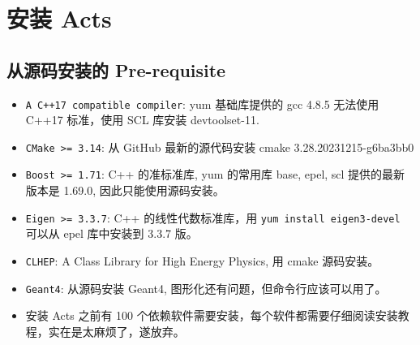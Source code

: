 \section{安装 Acts}
\subsection{从源码安装的 Pre-requisite}
\begin{itemize}
	\item \verb|A C++17 compatible compiler|: yum 基础库提供的 gcc 4.8.5 无法使用 C++17 标准，使用 SCL 库安装 devtoolset-11.
	\item \verb|CMake >= 3.14|: 从 GitHub 最新的源代码安装 cmake 3.28.20231215-g6ba3bb0
	\item \verb|Boost >= 1.71|: C++ 的准标准库, yum 的常用库 base, epel, scl 提供的最新版本是 1.69.0, 因此只能使用源码安装。
	\item \verb|Eigen >= 3.3.7|: C++ 的线性代数标准库，用 \verb|yum install eigen3-devel| 可以从 epel 库中安装到 3.3.7 版。
	\item \verb|CLHEP|: A Class Library for High Energy Physics, 用 cmake 源码安装。
	\item \verb|Geant4|: 从源码安装 Geant4, 图形化还有问题，但命令行应该可以用了。
	\item 安装 Acts 之前有 100 个依赖软件需要安装，每个软件都需要仔细阅读安装教程，实在是太麻烦了，遂放弃。
\end{itemize}

